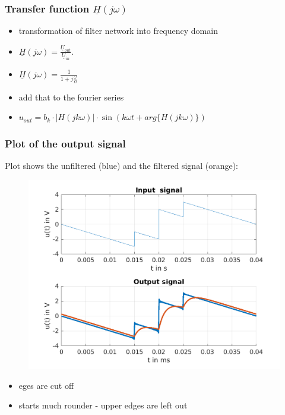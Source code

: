 \documentclass{beamer}
\begin{document}
\begin{frame}
  \frametitle{Transfer function $\underline{H}(j\omega)$}
  \begin{itemize}
    \item transformation of filter network into frequency domain
    \item $\underline{H}(j\omega) = \frac{\underline{U}_{out}}{\underline{U}_{in}}.$
    \item $\underline{H}(j\omega) = \frac{1}{1 + j\frac{\omega}{\Omega}}$
    \item add that to the fourier series
    \item $u_{out} = b_k \cdot |H(jk\omega)| \cdot \sin(k\omega t + arg\{H(jk\omega)\})$
  \end{itemize}
\end{frame}
\begin{frame}
  \frametitle{Plot of the output signal}
  Plot shows the unfiltered (blue) and the filtered signal (orange):
  \begin{figure}
    \includegraphics[scale=0.5]{../latex/Figures/output_signal.png}
  \end{figure}
  \begin{itemize}
    \item eges are cut off
    \item starts much rounder - upper edges are left out
  \end{itemize}
\end{frame}
\end{document}
